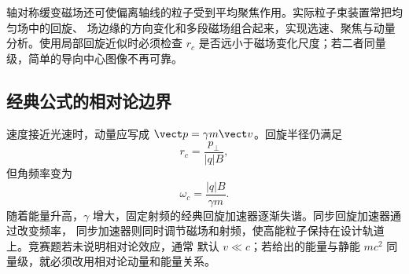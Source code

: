 轴对称缓变磁场还可使偏离轴线的粒子受到平均聚焦作用。实际粒子束装置常把均匀场中的回旋、
场边缘的方向变化和多段磁场组合起来，实现选速、聚焦与动量分析。使用局部回旋近似时必须检查
$r_c$ 是否远小于磁场变化尺度；若二者同量级，简单的导向中心图像不再可靠。

\subsection*{经典公式的相对论边界}

速度接近光速时，动量应写成 $\vect p=\gamma m\vect v$。回旋半径仍满足
\begin{equation}
 r_c=\frac{p_\perp}{|q|B},
\end{equation}
但角频率变为
\begin{equation}
 \omega_c=\frac{|q|B}{\gamma m}.
\end{equation}
随着能量升高，$\gamma$ 增大，固定射频的经典回旋加速器逐渐失谐。同步回旋加速器通过改变频率，
同步加速器则同时调节磁场和射频，使高能粒子保持在设计轨道上。竞赛题若未说明相对论效应，通常
默认 $v\ll c$；若给出的能量与静能 $mc^2$ 同量级，就必须改用相对论动量和能量关系。
